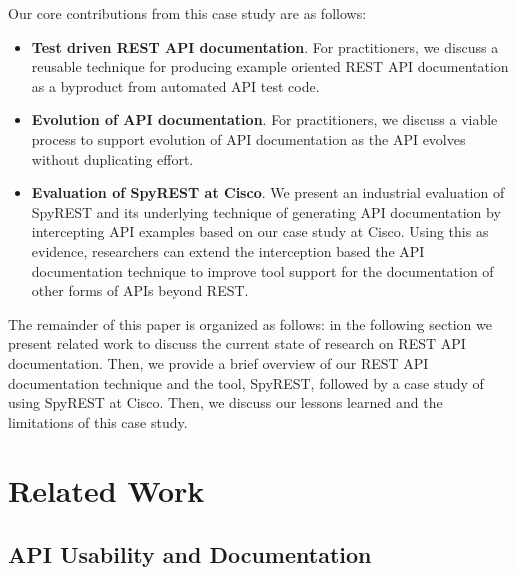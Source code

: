 Our core contributions from this case study are as follows:

\begin{itemize}
  \item \textbf{Test driven REST API documentation}. For practitioners, we discuss a reusable technique for producing example oriented REST API documentation as a byproduct from automated API test code.
  \item \textbf{Evolution of API documentation}. For practitioners, we discuss a viable process to support evolution of API documentation as the API evolves without duplicating effort.
  \item \textbf{Evaluation of SpyREST at Cisco}. We present an industrial evaluation of SpyREST and its underlying technique of generating API documentation by intercepting API examples based on our case study at Cisco. Using this as evidence, researchers can extend the interception based the API documentation technique to improve tool support for the documentation of other forms of APIs beyond REST.
\end{itemize}

The remainder of this paper is organized as follows: in the following section we present  related work to discuss the current state of research on REST API documentation. Then, we provide a brief overview of our REST API documentation technique and the tool, SpyREST, followed by a case study of using SpyREST at Cisco. Then, we discuss our lessons learned and the limitations of this case study.


\section{Related Work}

\subsection{API Usability and Documentation} %

